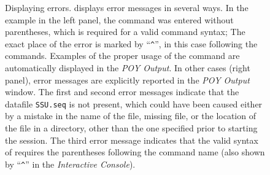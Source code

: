\begin{figure}
\begin{minipage}[c]{0.48\textwidth}
   	\end{minipage}
\caption{Displaying errors. \poy displays error messages in several ways. In the example in the left panel, the command  was entered without parentheses, which is required for a  valid \poy command syntax; The exact place of the error is marked by ``\texttt{\^}'', in this case  following the  commands. Examples of the proper usage of the command are automatically displayed in the \emph{POY Output}. In other cases (right panel), error messages are explicitly reported in the \emph{POY Output} window. The first and second error messages indicate that the datafile \texttt{SSU.seq} is not present, which could have been caused either by a mistake in the name of the file, missing file, or the location of the file in a directory, other than the one specified prior to starting the \poy session. The third error message indicates that the valid syntax of  requires the parentheses following the command name (also shown by ``\texttt{\^}'' in  the \emph{Interactive Console}).}
\label{fig:errors}
\end{figure}

